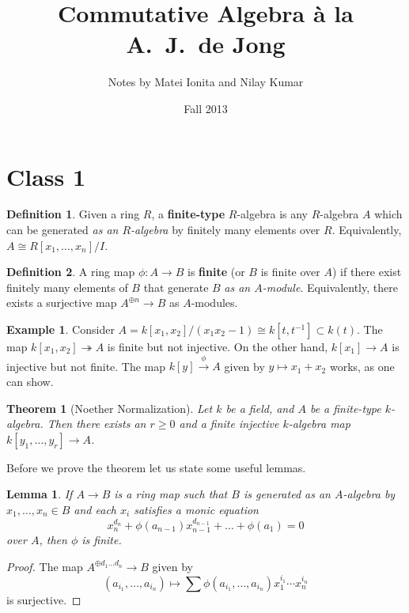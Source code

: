 \documentclass{article}
\title{Commutative Algebra \`a la A.~J.~de Jong}
\author{Notes by Matei Ionita and Nilay Kumar}
\date{Fall 2013}
\theoremstyle{plain}
\newtheorem*{thm*}{Theorem}
\newtheorem{lem}[thm]{Lemma}
\theoremstyle{definition}
\newtheorem{defn}{Definition}
\newtheorem{exmp}{Example}
\theoremstyle{remark}
\begin{document}
\maketitle

\section*{Class 1}

\begin{defn}
Given a ring $R$, a \textbf{finite-type} $R$-algebra is any $R$-algebra $A$ which can be generated \textit{as an $R$-algebra} by finitely many elements over $R$. Equivalently, $A\cong R[x_1,\ldots, x_n]/I$.
\end{defn}

\begin{defn}
A ring map $\phi:A\to B$ is \textbf{finite} (or $B$ is finite over $A$) if there exist finitely many elements of $B$ that generate $B$ \textit{as an $A$-module}. Equivalently, there exists a surjective map $A^{\oplus n}\to B$ as $A$-modules.
\end{defn}

\begin{exmp}
Consider $A=k[x_1,x_2]/(x_1x_2-1)\cong k[t,t^{-1}]\subset k(t)$. The map $k[x_1,x_2]\twoheadrightarrow A$ is finite but not injective. On the other hand, $k[x_1]\to A$ is injective but not finite. The map $k[y]\overset{\phi}{\to}A$ given by $y\mapsto x_1+x_2$ works, as one can show.
\end{exmp}


\begin{thm*}[Noether Normalization]
Let $k$ be a field, and $A$ be a finite-type $k$-algebra. Then there exists an $r\geq0$ and a finite injective $k$-algebra map $k[y_1,\ldots,y_r]\to A$.
\end{thm*}

Before we prove the theorem let us state some useful lemmas.

\begin{lem}
\label{L1}
If $A\to B$ is a ring map such that $B$ is generated as an $A$-algebra by $x_1,\ldots,x_n\in B$ and each $x_i$ satisfies a monic equation
\[x_n^{d_n}+\phi(a_{n-1})x_{n-1}^{d_{n-1}}+\ldots+\phi(a_1)=0\]
over $A$, then $\phi$ is finite.
\end{lem}
\begin{proof}
The map $A^{\oplus d_1\ldots d_n}\to B$ given by
\[(a_{i_1},\ldots,a_{i_n})\mapsto\sum\phi(a_{i_1},\ldots,a_{i_n})x_1^{i_1}\cdots x_n^{i_n}\]
is surjective.
\end{proof}
\end{document}
